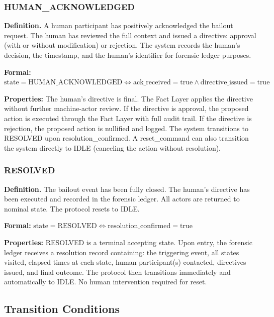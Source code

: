 \subsubsection{HUMAN\_ACKNOWLEDGED}

\textbf{Definition.} A human participant has positively acknowledged the bailout request. The human has reviewed the full context and issued a directive: approval (with or without modification) or rejection. The system records the human's decision, the timestamp, and the human's identifier for forensic ledger purposes.

\textbf{Formal:} $\text{state} = \text{HUMAN\_ACKNOWLEDGED} \Leftrightarrow \text{ack\_received} = \text{true} \land \text{directive\_issued} = \text{true}$

\textbf{Properties:} The human's directive is final. The Fact Layer applies the directive without further machine-actor review. If the directive is approval, the proposed action is executed through the Fact Layer with full audit trail. If the directive is rejection, the proposed action is nullified and logged. The system transitions to RESOLVED upon resolution\_confirmed. A reset\_command can also transition the system directly to IDLE (canceling the action without resolution).

\subsubsection{RESOLVED}

\textbf{Definition.} The bailout event has been fully closed. The human's directive has been executed and recorded in the forensic ledger. All actors are returned to nominal state. The protocol resets to IDLE.

\textbf{Formal:} $\text{state} = \text{RESOLVED} \Leftrightarrow \text{resolution\_confirmed} = \text{true}$

\textbf{Properties:} RESOLVED is a terminal accepting state. Upon entry, the forensic ledger receives a resolution record containing: the triggering event, all states visited, elapsed times at each state, human participant(s) contacted, directives issued, and final outcome. The protocol then transitions immediately and automatically to IDLE. No human intervention required for reset.

\subsection{Transition Conditions}

